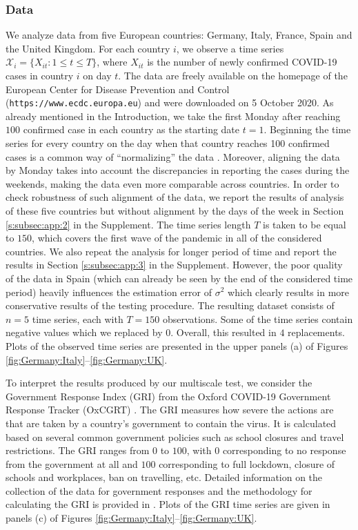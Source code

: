 \documentclass[a4paper,12pt]{article}
\numberwithin{equation}{section}
\begin{document}
\subsubsection{Data}


We analyze data from five European countries: Germany, Italy, France, Spain and the United Kingdom. For each country $i$, we observe a time series $\mathcal{X}_i = \{ X_{it}: 1 \le t \le T \}$, where $X_{it}$ is the number of newly confirmed COVID-19 cases in country $i$ on day $t$. The data are freely available on the homepage of the European Center for Disease Prevention and Control (\texttt{https://www.ecdc.europa.eu}) and were downloaded on 5 October 2020. As already mentioned in the Introduction, we take the first Monday after reaching $100$ confirmed case in each country as the starting date $t=1$. Beginning the time series for every country on the day when that country reaches 100 confirmed cases is a common way of ``normalizing'' the data \citep[cp.][]{Cohen2020}. Moreover, aligning the data by Monday takes into account the discrepancies in reporting the cases during the weekends, making the data even more comparable across countries. In order to check robustness of such alignment of the data, we report the results of analysis of these five countries but without alignment by the days of the week in Section \ref{s:subsec:app:2} in the Supplement. The time series length $T$ is taken to be equal to $150$, which covers the first wave of the pandemic in all of the considered countries. We also repeat the analysis for longer period of time and report the results in Section \ref{s:subsec:app:3} in the Supplement. However, the poor quality of the data in Spain (which can already be seen by the end of the considered time period) heavily influences the estimation error of $\sigma^2$ which clearly results in more conservative results of the testing procedure. The resulting dataset consists of $n = 5$ time series, each with $T = 150$ observations. Some of the time series contain negative values which we replaced by $0$. Overall, this resulted in $4$ replacements. Plots of the observed time series are presented in the upper panels (a) of Figures \ref{fig:Germany:Italy}--\ref{fig:Germany:UK}.


To interpret the results produced by our multiscale test, we consider the Government Response Index (GRI) from the Oxford COVID-19 Government Response Tracker (OxCGRT) \citep{Hale2020}. The GRI measures how severe the actions are that are taken by a country's government to contain the virus. It is calculated based on several common government policies such as school closures and travel restrictions. The GRI ranges from $0$ to $100$, with $0$ corresponding to no response from the government at all and $100$ corresponding to full lockdown, closure of schools and workplaces, ban on travelling, etc. Detailed information on the collection of the data for government responses and the methodology for calculating the GRI is provided in \cite{Hale2020paper}. Plots of the GRI time series are given in panels (c) of Figures \ref{fig:Germany:Italy}--\ref{fig:Germany:UK}.
\end{document}
